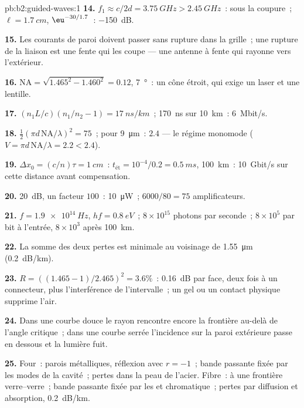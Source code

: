 \begin{solution}{pb:b2:guided-waves:1}
\textbf{14.} $f_1 \approx c/2d = \qty{3.75}{GHz} > \qty{2.45}{GHz}$~: sous la coupure~; $\ell =
\qty{1.7}{cm}$, $\eu^{-30/1.7}$~: \qty{-150}{dB}.

\textbf{15.} Les courants de paroi doivent passer sans rupture dans la grille~;
une rupture de la liaison est une fente qui les coupe --- une antenne à fente
qui rayonne vers l'extérieur.

\textbf{16.} $\mathrm{NA} = \sqrt{1.465^2 - 1.460^2} = 0.12$, \qty{7}{\degree}~: un cône
étroit, qui exige un laser et une lentille.

\textbf{17.} $(n_1L/c)(n_1/n_2 - 1) = \qty{17}{ns/km}$~; \qty{170}{ns} sur \qty{10}{km}~:
\qty{6}{Mbit/s}.

\textbf{18.} $\tfrac12(\pi d\,\mathrm{NA}/\lambda)^2 = 75$~; pour \qty{9}{\micro m}~: $2.4$ --- le
régime monomode ($V = \pi d\,\mathrm{NA}/\lambda = 2.2 < 2.4$).

\textbf{19.} $\Delta x_0 = (c/n)\tau = \qty{1}{cm}$~: $t_{\text{ét}} = 10^{-4}/0.2 = \qty{0.5}{ms}$,
\qty{100}{km}~: \qty{10}{Gbit/s} sur cette distance avant compensation.

\textbf{20.} \qty{20}{dB}, un facteur $100$~: \qty{10}{\micro W}~; $6000/80 = 75$
amplificateurs.

\textbf{21.} $f = \qty{1.9e14}{Hz}$, $hf = \qty{0.8}{eV}$~; $8 \times 10^{15}$ photons par
seconde~; $8 \times 10^5$ par bit à l'entrée, $8 \times 10^3$ après \qty{100}{km}.

\textbf{22.} La somme des deux pertes est minimale au voisinage de \qty{1.55}{\micro m}
(\qty{0.2}{dB/km}).

\textbf{23.} $R = ((1.465 - 1)/2.465)^2 = 3.6\%$~: \qty{0.16}{dB} par face, deux fois
à un connecteur, plus l'interférence de l'intervalle~; un gel ou un contact physique
supprime l'air.

\textbf{24.} Dans une courbe douce le rayon rencontre encore la frontière au-delà
de l'angle critique~; dans une courbe serrée l'incidence sur la paroi extérieure
passe en dessous et la lumière fuit.

\textbf{25.} Four~: parois métalliques, réflexion avec $r = -1$~; bande passante fixée
par les modes de la cavité~; pertes dans la peau de l'acier. Fibre~:  à une frontière verre--verre~; bande passante fixée par les  et
chromatique~; pertes par diffusion et absorption, \qty{0.2}{dB/km}.
\end{solution}
